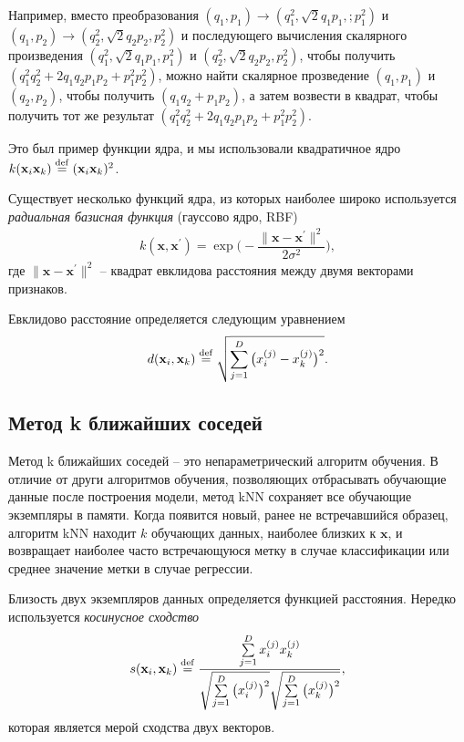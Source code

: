 \documentclass[%
	11pt,
	a4paper,
	utf8,
		]{article}
\begin{document}
Например, вместо преобразования $ (q_1, p_1) \to (q_1^2, \sqrt{2} q_1 p_1, ;p_1^2) $ и $ (q_1, p_2) \to (q_2^2, \sqrt{2} q_2 p_2, p_2^2) $ и последующего вычисления скалярного произведения $ (q_1^2, \sqrt{2} q_1 p_1, p_1^2) $ и $ (q_2^2, \sqrt{2} q_2 p_2, p_2^2) $, чтобы получить $ (q_1^2 q_2^2 + 2 q_1 q_2 p_1 p_2 + p_1^2 p_2^2) $, можно найти скалярное прозведение $ (q_1, p_1) $ и $ (q_2, p_2) $, чтобы получить $ (q_1 q_2 + p_1 p_2) $, а затем возвести в квадрат, чтобы получить тот же результат $ (q_1^2 q_2^2 + 2 q_1 q_2 p_1 p_2 + p_1^2 p_2^2) $.

Это был пример функции ядра, и мы использовали квадратичное ядро $ k( \mathbf{x}_i \mathbf{x}_k )  \mathrel{ \stackrel{\rm def}{=} ( \mathbf{x}_i \mathbf{x}_k )^2 } $.

Существует несколько функций ядра, из которых наиболее широко используется \emph{радиальная базисная функция} (гауссово ядро, RBF)
\begin{align*}
	k( \mathbf{x}, \mathbf{x}^{'} ) = \exp \Big( - \dfrac{ \| \mathbf{x} - \mathbf{x}^{'} \|^2 }{ 2 \sigma^2 } \Big),
\end{align*}
где $ \| \mathbf{x} - \mathbf{x}^{'} \|^2 $ -- квадрат евклидова расстояния между двумя векторами признаков.

Евклидово расстояние определяется следующим уравнением
\begin{align*}
	d( \mathbf{x}_i, \mathbf{x}_k ) \mathrel{ \stackrel{\rm def}{=} } \sqrt{ \sum_{j=1}^D \big( x_i^{(j)} - x_k^{(j)} \big)^2 }.
\end{align*}

\subsection{Метод k ближайших соседей}

Метод k ближайших соседей -- это непараметрический алгоритм обучения. В отличие от други алгоритмов обучения, позволяющих отбрасывать обучающие данные после построения модели, метод kNN сохраняет все обучающие экземпляры в памяти. Когда появится новый, ранее не встречавшийся образец, алгоритм kNN находит $ k $ обучающих данных, наиболее близких к $ \mathbf{x} $, и возвращает наиболее часто встречающуюся метку в случае классификации или среднее значение метки в случае регрессии.

Близость двух экземпляров данных определяется функцией расстояния. Нередко используется \emph{косинусное сходство}
\begin{align*}
	s( \mathbf{x}_i, \mathbf{x}_k ) \mathrel{ \stackrel{\rm def}{=} } \dfrac{ \sum\limits_{j=1}^D x_i^{(j)} x_k^{(j)} }{ \sqrt{ \sum\limits_{j=1}^D \big( x_i^{(j)} \big)^2 } \sqrt{ \sum\limits_{j=1}^D \big( x_k^{(j)} \big)^2 } },
\end{align*}
которая является мерой сходства двух векторов.
\end{document}

